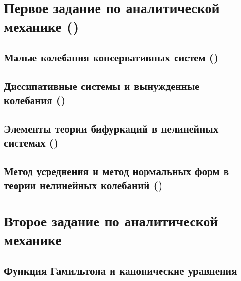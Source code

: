 



\section{Первое задание по аналитической механике \texorpdfstring{(\checkmark)}{(ок)}}


\subsection{Малые колебания консервативных систем \texorpdfstring{(\checkmark)}{(ок)}}


\newpage

\subsection{Диссипативные системы и вынужденные колебания \texorpdfstring{(\checkmark)}{(ок)}}


\newpage

\subsection{Элементы теории бифуркаций в нелинейных системах \texorpdfstring{(\checkmark)}{(ок)}}


\newpage

\subsection{Метод усреднения и метод нормальных форм в теории нелинейных колебаний \texorpdfstring{(\checkmark)}{(ок)}}


% 

% 

\section{Второе задание по аналитической механике}

\subsection{Функция Гамильтона и канонические уравнения}


